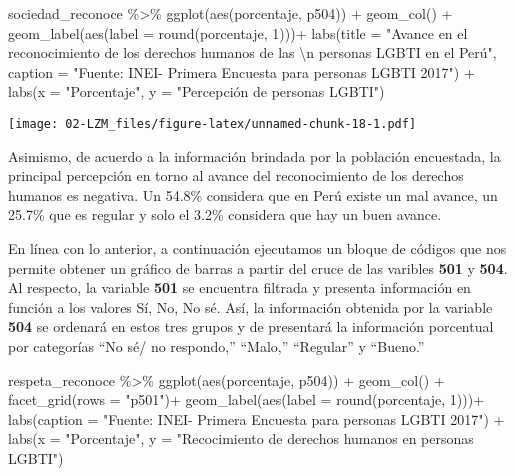 \documentclass[
]{book}
\newenvironment{Shaded}{\begin{snugshade}}{\end{snugshade}}
\newcommand{\AttributeTok}[1]{\textcolor[rgb]{0.77,0.63,0.00}{#1}}
\newcommand{\DecValTok}[1]{\textcolor[rgb]{0.00,0.00,0.81}{#1}}
\newcommand{\FunctionTok}[1]{\textcolor[rgb]{0.00,0.00,0.00}{#1}}
\newcommand{\NormalTok}[1]{#1}
\newcommand{\SpecialCharTok}[1]{\textcolor[rgb]{0.00,0.00,0.00}{#1}}
\newcommand{\StringTok}[1]{\textcolor[rgb]{0.31,0.60,0.02}{#1}}
\theoremstyle{definition}
\theoremstyle{definition}
\theoremstyle{definition}
\theoremstyle{definition}
\theoremstyle{remark}
\begin{document}
\begin{Shaded}
\begin{Highlighting}[]
\NormalTok{sociedad\_reconoce }\SpecialCharTok{\%\textgreater{}\%} 
  \FunctionTok{ggplot}\NormalTok{(}\FunctionTok{aes}\NormalTok{(porcentaje, p504)) }\SpecialCharTok{+}
  \FunctionTok{geom\_col}\NormalTok{() }\SpecialCharTok{+}
  \FunctionTok{geom\_label}\NormalTok{(}\FunctionTok{aes}\NormalTok{(}\AttributeTok{label =} \FunctionTok{round}\NormalTok{(porcentaje, }\DecValTok{1}\NormalTok{)))}\SpecialCharTok{+}
  \FunctionTok{labs}\NormalTok{(}\AttributeTok{title =} \StringTok{"Avance en el reconocimiento de los derechos humanos de las }\SpecialCharTok{\textbackslash{}n}\StringTok{ personas LGBTI en el Perú"}\NormalTok{, }
       \AttributeTok{caption =} \StringTok{"Fuente: INEI{-} Primera Encuesta para personas LGBTI 2017"}\NormalTok{) }\SpecialCharTok{+}
  \FunctionTok{labs}\NormalTok{(}\AttributeTok{x =} \StringTok{"Porcentaje"}\NormalTok{,}
       \AttributeTok{y =} \StringTok{"Percepción de personas LGBTI"}\NormalTok{)}
\end{Highlighting}
\end{Shaded}

\texttt{[image: 02-LZM\_files/figure-latex/unnamed-chunk-18-1.pdf]}

Asimismo, de acuerdo a la información brindada por la población encuestada, la principal percepción en torno al avance del reconocimiento de los derechos humanos es negativa. Un 54.8\% considera que en Perú existe un mal avance, un 25.7\% que es regular y solo el 3.2\% considera que hay un buen avance.

En línea con lo anterior, a continuación ejecutamos un bloque de códigos que nos permite obtener un gráfico de barras a partir del cruce de las varibles \textbf{501} y \textbf{504}. Al respecto, la variable \textbf{501} se encuentra filtrada y presenta información en función a los valores Sí, No, No sé. Así, la información obtenida por la variable \textbf{504} se ordenará en estos tres grupos y de presentará la información porcentual por categorías ``No sé/ no respondo,'' ``Malo,'' ``Regular'' y ``Bueno.''

\begin{Shaded}
\begin{Highlighting}[]
\NormalTok{respeta\_reconoce }\SpecialCharTok{\%\textgreater{}\%} 
  \FunctionTok{ggplot}\NormalTok{(}\FunctionTok{aes}\NormalTok{(porcentaje, p504)) }\SpecialCharTok{+}
  \FunctionTok{geom\_col}\NormalTok{() }\SpecialCharTok{+}
  \FunctionTok{facet\_grid}\NormalTok{(}\AttributeTok{rows =} \StringTok{"p501"}\NormalTok{)}\SpecialCharTok{+}
  \FunctionTok{geom\_label}\NormalTok{(}\FunctionTok{aes}\NormalTok{(}\AttributeTok{label =} \FunctionTok{round}\NormalTok{(porcentaje, }\DecValTok{1}\NormalTok{)))}\SpecialCharTok{+}
  \FunctionTok{labs}\NormalTok{(}\AttributeTok{caption =} \StringTok{"Fuente: INEI{-} Primera Encuesta para personas LGBTI 2017"}\NormalTok{) }\SpecialCharTok{+}
  \FunctionTok{labs}\NormalTok{(}\AttributeTok{x =} \StringTok{"Porcentaje"}\NormalTok{,}
       \AttributeTok{y =} \StringTok{"Recocimiento de derechos humanos en personas LGBTI"}\NormalTok{)}
\end{Highlighting}
\end{Shaded}
\end{document}
